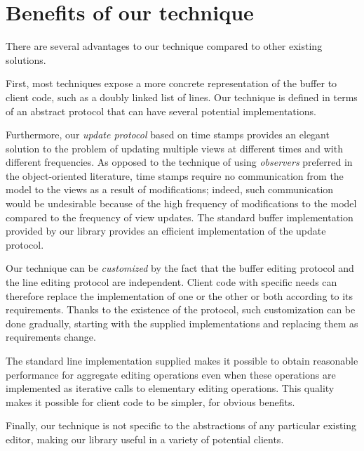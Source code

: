 \section{Benefits of our technique}
 
There are several advantages to our technique compared to other
existing solutions.

First, most techniques expose a more concrete representation of the
buffer to client code, such as a doubly linked list of lines.  Our
technique is defined in terms of an abstract \clos{} protocol that can
have several potential implementations.

Furthermore, our \emph{update protocol} based on time stamps provides
an elegant solution to the problem of updating multiple views at
different times and with different frequencies.  As opposed to the
technique of using \emph{observers} preferred in the object-oriented
literature, time stamps require no communication from the model to the
views as a result of modifications; indeed, such communication would
be undesirable because of the high frequency of modifications to the
model compared to the frequency of view updates.  The standard buffer
implementation provided by our library provides an efficient
implementation of the update protocol.

Our technique can be \emph{customized} by the fact that the buffer
editing protocol and the line editing protocol are independent.
Client code with specific needs can therefore replace the
implementation of one or the other or both according to its
requirements.  Thanks to the existence of the \clos{} protocol, such
customization can be done gradually, starting with the supplied
implementations and replacing them as requirements change.

The standard line implementation supplied makes it possible to obtain
reasonable performance for aggregate editing operations even when
these operations are implemented as iterative calls to elementary
editing operations.  This quality makes it possible for client code to
be simpler, for obvious benefits.

Finally, our technique is not specific to the abstractions of any
particular existing editor, making our library useful in a variety of
potential clients.
